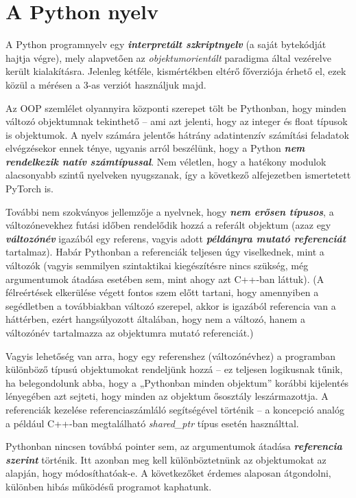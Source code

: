 \documentclass[12pt,a4paper,oneside]{report}             %
\begin{document}
\section{A Python nyelv}

A Python programnyelv egy \textbf{\textit{interpretált szkriptnyelv}} (a saját bytekódját hajtja végre), mely alapvetően az \emph{objektumorientált} paradigma által vezérelve került kialakításra. Jelenleg kétféle, kismértékben eltérő főverziója érhető el, ezek közül a mérésen a 3-as verziót használjuk majd.

Az OOP szemlélet olyannyira központi szerepet tölt be Pythonban, hogy minden változó objektumnak tekinthető – ami azt jelenti, hogy az integer és float típusok is objektumok. A nyelv számára jelentős hátrány adatintenzív számítási feladatok elvégzésekor ennek ténye, ugyanis arról beszélünk, hogy a Python \textbf{\textit{nem rendelkezik natív számtípussal}}. Nem véletlen, hogy a hatékony modulok alacsonyabb szintű nyelveken nyugszanak, így a következő alfejezetben ismertetett PyTorch is.

További nem szokványos jellemzője a nyelvnek, hogy \textbf{\textit{nem erősen típusos}}, a változónevekhez futási időben rendelődik hozzá a referált objektum (azaz egy \textbf{\textit{változónév}} igazából egy referens, vagyis adott \textbf{\textit{példányra mutató referenciát}} tartalmaz). Habár Pythonban a referenciák teljesen úgy viselkednek, mint a változók (vagyis semmilyen szintaktikai kiegészítésre nincs szükség, még argumentumok átadása esetében sem, mint ahogy azt C++-ban láttuk). (A félreértések elkerülése végett fontos szem előtt tartani, hogy amennyiben a segédletben a továbbiakban változó szerepel, akkor is igazából referencia van a háttérben, ezért hangsúlyozott általában, hogy nem a változó, hanem a változónév tartalmazza az objektumra mutató referenciát.)

Vagyis lehetőség van arra, hogy egy referenshez (változónévhez) a programban különböző típusú objektumokat rendeljünk hozzá – ez teljesen logikusnak tűnik, ha belegondolunk abba, hogy a „Pythonban minden objektum” korábbi kijelentés lényegében azt sejteti, hogy minden az objektum ősosztály leszármazottja. A referenciák kezelése referenciaszámláló segítségével történik – a koncepció analóg a például C++-ban megtalálható \emph{shared\_ptr} típus esetén használttal.

Pythonban nincsen továbbá pointer sem, az argumentumok átadása \textbf{\textit{referencia szerint}} történik. Itt azonban meg kell különböztetnünk az objektumokat az alapján, hogy módosíthatóak-e. A következőket érdemes alaposan átgondolni, különben hibás működésű programot kaphatunk.
\end{document}

